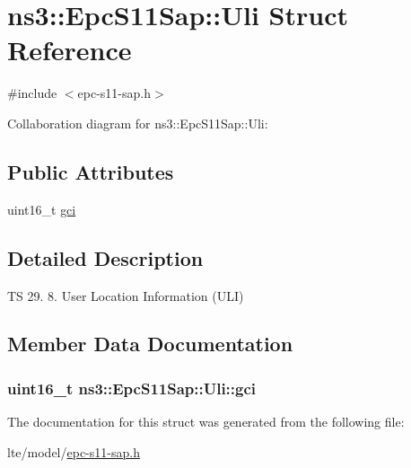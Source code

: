 \hypertarget{structns3_1_1EpcS11Sap_1_1Uli}{}\section{ns3\+:\+:Epc\+S11\+Sap\+:\+:Uli Struct Reference}
\label{structns3_1_1EpcS11Sap_1_1Uli}


{\ttfamily \#include $<$epc-\/s11-\/sap.\+h$>$}



Collaboration diagram for ns3\+:\+:Epc\+S11\+Sap\+:\+:Uli\+:
\subsection*{Public Attributes}
\begin{DoxyCompactItemize}
\item 
uint16\+\_\+t \hyperlink{structns3_1_1EpcS11Sap_1_1Uli_a8a237ec721c35ff068bbff72406414da}{gci}
\end{DoxyCompactItemize}


\subsection{Detailed Description}
TS 29. 8. User Location Information (U\+LI) 

\subsection{Member Data Documentation}
\subsubsection[{\texorpdfstring{gci}{gci}}]{\setlength{\rightskip}{0pt plus 5cm}uint16\+\_\+t ns3\+::\+Epc\+S11\+Sap\+::\+Uli\+::gci}\hypertarget{structns3_1_1EpcS11Sap_1_1Uli_a8a237ec721c35ff068bbff72406414da}{}\label{structns3_1_1EpcS11Sap_1_1Uli_a8a237ec721c35ff068bbff72406414da}


The documentation for this struct was generated from the following file\+:\begin{DoxyCompactItemize}
\item 
lte/model/\hyperlink{epc-s11-sap_8h}{epc-\/s11-\/sap.\+h}\end{DoxyCompactItemize}
